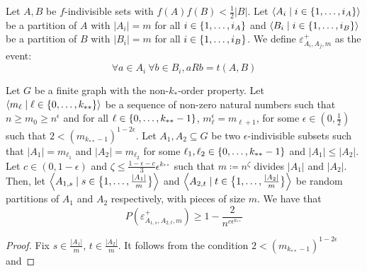     \begin{definition}
        Let $A, B$ be $f$-indivisible sets with $f(A) f(B) < \frac{1}{2} |B|$.
        Let $\left< A_i \mid i \in \{ 1, \dots, i_A \} \right>$ be a partition of $A$ with $|A_i| = m$ for all
        $i \in \{ 1, \dots, i_A \}$ and $\left< B_i \mid i \in \{ 1, \dots, i_B \} \right>$ be a partition of
        $B$ with $|B_i| = m$ for all $i \in \{ 1, \dots, i_B \}$.
        We define $\varepsilon^+_{A_i,A_j,m}$ as the event:
        \[
            \forall a \in A_i \ \forall b \in B_i, a R b = t(A,B)
        \]
    \end{definition}

    \begin{lemma}[Claim 4.13] \label{lem:bound_on_the_probability_of_a_subpair_having_no_exceptions}
        Let $G$ be a finite graph with the non-$k_{*}$-order property.
        Let $\left< m_\ell \mid \ell \in \{ 0, \dots, k_{**} \} \right>$ be a sequence of non-zero natural numbers such that
        $n \geq m_0 \geq n^\epsilon$  and for all $\ell \in \{ 0, \dots, k_{**}-1 \}$, $m_\ell^\epsilon = m_{\ell+1}$,
        for some $\epsilon \in (0, \frac{1}{2})$ such that $2 < (m_{k_{**}-1})^{1-2\epsilon}$.
        Let $A_1, A_2 \subseteq G$ be two $\epsilon$-indivisible subsets such that $|A_1| = m_{\ell_1}$ and $|A_2| = m_{\ell_2}$
        for some $\ell_1, \ell_2 \in \{ 0, \dots, k_{**}-1 \}$ and $|A_1| \leq |A_2|$.
        Let $c \in (0, 1-\epsilon)$ and $\zeta \leq \frac{1 - \epsilon - c}{3}\epsilon^{k_{**}}$ such that
        $m \coloneqq n^\zeta$ divides $|A_1|$ and $|A_2|$.
        Then, let $\left< A_{1,s} \mid s \in \bigl\{ 1, \dots, \frac{|A_1|}{m} \bigr\} \right>$ and
        $\left< A_{2,t} \mid t \in \bigl\{ 1, \dots, \frac{|A_2|}{m} \bigr\} \right>$ be random partitions of $A_1$ and $A_2$
        respectively, with pieces of size $m$.
        We have that
        \[
            P(\varepsilon^+_{A_{1,s},A_{2,t},m}) \geq 1 - \frac{2}{n^{c\epsilon^{k_{**}}}}
        \]
        \begin{proof}
            Fix $s \in \frac{|A_1|}{m}$, $t \in \frac{|A_2|}{m}$.
            It follows from the condition $2 < (m_{k_{**}-1})^{1-2\epsilon}$ and 

\end{proof}
\end{lemma}
